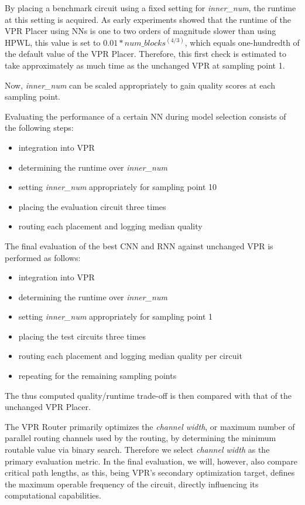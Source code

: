 By placing a benchmark circuit using a fixed setting for \textit{inner\_num}, the runtime at this setting is acquired. As early experiments showed that the runtime of the \gls{VPR} Placer using \glspl{NN} is one to two orders of magnitude slower than using \gls{HPWL}, this value is set to $0.01*num\_blocks^(4/3)$, which equals one-hundredth of the default value of the \gls{VPR} Placer. Therefore, this first check is estimated to take approximately as much time as the unchanged \gls{VPR} at sampling point 1.

\pagebreak

Now, \textit{inner\_num} can be scaled appropriately to gain quality scores at each sampling point.

Evaluating the performance of a certain \gls{NN} during model selection consists of the following steps:

\begin{itemize}
	\item integration into \gls{VPR}
	\item determining the runtime over \textit{inner\_num}
	\item setting \textit{inner\_num} appropriately for sampling point 10
	\item placing the evaluation circuit three times
	\item routing each placement and logging median quality 
\end{itemize}

The final evaluation of the best \gls{CNN} and \gls{RNN} against unchanged \gls{VPR} is performed as follows:

\begin{itemize}
	\item integration into \gls{VPR}
	\item determining the runtime over \textit{inner\_num}
	\item setting \textit{inner\_num} appropriately for sampling point 1
	\item placing the test circuits three times
	\item routing each placement and logging median quality per circuit
	\item repeating for the remaining sampling points
\end{itemize}

The thus computed quality/runtime trade-off is then compared with that of the unchanged \gls{VPR} Placer.

The \gls{VPR} Router primarily optimizes the \textit{channel width}, or maximum number of parallel routing channels used by the routing, by determining the minimum routable value via binary search. Therefore we select \textit{channel width} as the primary evaluation metric. In the final evaluation, we will, however, also compare critical path lengths, as this, being \gls{VPR}'s secondary optimization target, defines the maximum operable frequency of the circuit, directly influencing its computational capabilities.


